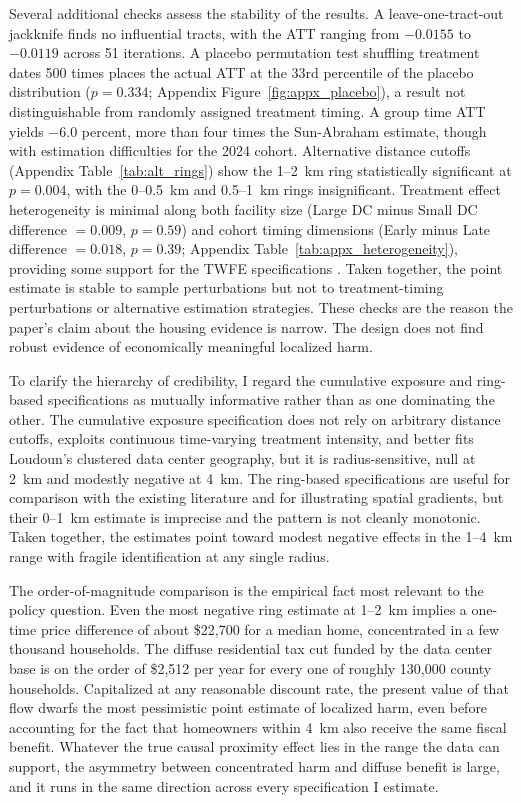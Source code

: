 \documentclass[12pt]{article}
\begin{document}
Several additional checks assess the stability of the results. A leave-one-tract-out jackknife finds no influential tracts, with the ATT ranging from $-0.0155$ to $-0.0119$ across 51 iterations. A placebo permutation test shuffling treatment dates 500 times places the actual ATT at the 33rd percentile of the placebo distribution ($p = 0.334$; Appendix Figure~\ref{fig:appx_placebo}), a result not distinguishable from randomly assigned treatment timing. A \citet{CallawaySantAnna2021} group time ATT yields $-6.0$ percent, more than four times the Sun-Abraham estimate, though with estimation difficulties for the 2024 cohort. Alternative distance cutoffs (Appendix Table~\ref{tab:alt_rings}) show the 1--2~km ring statistically significant at $p = 0.004$, with the 0--0.5~km and 0.5--1~km rings insignificant. Treatment effect heterogeneity is minimal along both facility size (Large DC minus Small DC difference $=0.009$, $p=0.59$) and cohort timing dimensions (Early minus Late difference $=0.018$, $p=0.39$; Appendix Table~\ref{tab:appx_heterogeneity}), providing some support for the TWFE specifications \citep{Roth2023}. Taken together, the point estimate is stable to sample perturbations but not to treatment-timing perturbations or alternative estimation strategies. These checks are the reason the paper's claim about the housing evidence is narrow. The design does not find robust evidence of economically meaningful localized harm.

To clarify the hierarchy of credibility, I regard the cumulative exposure and ring-based specifications as mutually informative rather than as one dominating the other. The cumulative exposure specification does not rely on arbitrary distance cutoffs, exploits continuous time-varying treatment intensity, and better fits Loudoun's clustered data center geography, but it is radius-sensitive, null at 2~km and modestly negative at 4~km. The ring-based specifications are useful for comparison with the existing literature and for illustrating spatial gradients, but their 0--1~km estimate is imprecise and the pattern is not cleanly monotonic. Taken together, the estimates point toward modest negative effects in the 1--4~km range with fragile identification at any single radius.

The order-of-magnitude comparison is the empirical fact most relevant to the policy question. Even the most negative ring estimate at 1--2~km implies a one-time price difference of about \$22,700 for a median home, concentrated in a few thousand households. The diffuse residential tax cut funded by the data center base is on the order of \$2,512 per year for every one of roughly 130,000 county households. Capitalized at any reasonable discount rate, the present value of that flow dwarfs the most pessimistic point estimate of localized harm, even before accounting for the fact that homeowners within 4~km also receive the same fiscal benefit. Whatever the true causal proximity effect lies in the range the data can support, the asymmetry between concentrated harm and diffuse benefit is large, and it runs in the same direction across every specification I estimate.
\end{document}
